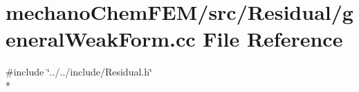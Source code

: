 \section{mechano\-Chem\-F\-E\-M/src/\-Residual/general\-Weak\-Form.cc File Reference}
\label{general_weak_form_8cc}
{\ttfamily \#include \char`\"{}../../include/\-Residual.\-h\char`\"{}}\\*
